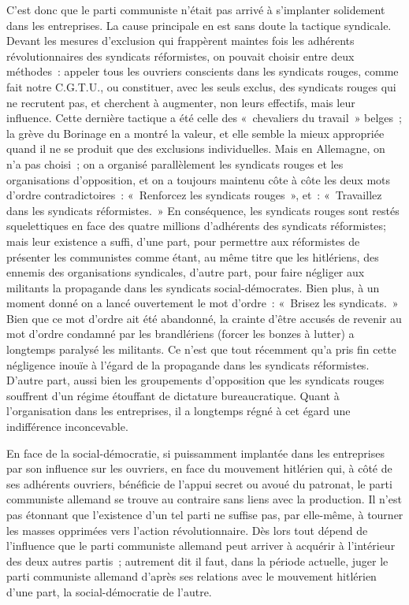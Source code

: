 \documentclass[french,twoside]{book} %
\begin{document}
C'est donc que le parti communiste n'était pas arrivé à s'implanter solide­ment dans les entreprises. La cause principale en est sans doute la tactique syndicale. Devant les mesures d'exclusion qui frappèrent maintes fois les adhérents révolutionnaires des syndicats réformistes, on pouvait choisir entre deux méthodes : appeler tous les ouvriers conscients dans les syndicats rouges, comme fait notre C.G.T.U., ou constituer, avec les seuls exclus, des syndicats rouges qui ne recrutent pas, et cherchent à augmenter, non leurs effectifs, mais leur influence. Cette dernière tactique a été celle des « che­valiers du travail » belges ; la grève du Borinage en a montré la valeur, et elle semble la mieux appropriée quand il ne se produit que des exclusions indivi­duelles. Mais en Allemagne, on n’a pas choisi ; on a organisé parallèlement les syndicats rouges et les organisations d'opposition, et on a toujours main­tenu côte à côte les deux mots d'ordre contradictoires : « Renforcez les syndicats rouges », et : « Travaillez dans les syndicats réformistes. » En conséquence, les syndicats rouges sont restés squelettiques en face des quatre millions d'adhérents des syndicats réformistes; mais leur existence a suffi, d'une part, pour permettre aux réformistes de présenter les communistes comme étant, au même titre que les hitlériens, des ennemis des organisations syndicales, d'autre part, pour faire négliger aux militants la propagande dans les syndicats social-démocrates. Bien plus, à un moment donné on a lancé ouvertement le mot d'ordre : « Brisez les syndicats. » Bien que ce mot d'ordre ait été abandonné, la crainte d'être accusés de revenir au mot d'ordre condam­né par les brandlériens (forcer les bonzes à lutter) a longtemps paralysé les militants. Ce n'est que tout récemment qu'a pris fin cette négligence inouïe à l'égard de la propagande dans les syndicats réformistes. D'autre part, aussi bien les groupements d'opposition que les syndicats rouges souffrent d'un régime étouffant de dictature bureaucratique. Quant à l'organisation dans les entreprises, il a longtemps régné à cet égard une indifférence inconcevable.\par
En face de la social-démocratie, si puissamment implantée dans les entre­prises par son influence sur les ouvriers, en face du mouvement hitlérien qui, à côté de ses adhérents ouvriers, bénéficie de l'appui secret ou avoué du patronat, le parti communiste allemand se trouve au contraire sans liens avec la production. Il n'est pas étonnant que l'existence d'un tel parti ne suffise pas, par elle-même, à tourner les masses opprimées vers l'action révolutionnaire. Dès lors tout dépend de l'influence que le parti communiste allemand peut arriver à acquérir à l'intérieur des deux autres partis ; autrement dit il faut, dans la période actuelle, juger le parti communiste allemand d'après ses rela­tions avec le mouvement hitlérien d'une part, la social-démocratie de l'autre.\par
\end{document}
